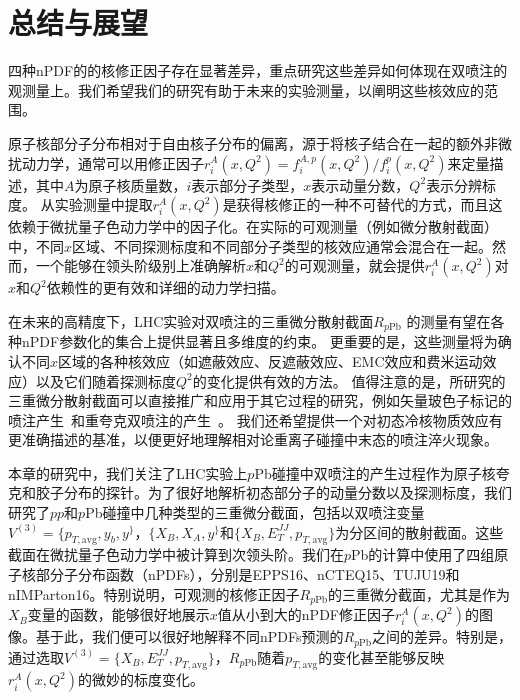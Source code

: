 
\chapter{总结与展望}

四种nPDF的的核修正因子存在显著差异，重点研究这些差异如何体现在双喷注的观测量上。我们希望我们的研究有助于未来的实验测量，以阐明这些核效应的范围。



	原子核部分子分布相对于自由核子分布的偏离，源于将核子结合在一起的额外非微扰动力学，通常可以用修正因子$r_i^A(x,Q^2)={f_i^{A,p}(x,Q^2)}/{f_i^p(x,Q^2)}$来定量描述，其中$A$为原子核质量数，$i$表示部分子类型，$x$表示动量分数，$Q^2$表示分辨标度。
	从实验测量中提取$r_i^A(x,Q^2)$是获得核修正的一种不可替代的方式，而且这依赖于微扰量子色动力学中的因子化。在实际的可观测量（例如微分散射截面）中，不同$x$区域、不同探测标度和不同部分子类型的核效应通常会混合在一起。然而，一个能够在领头阶级别上准确解析$x$和$Q^2$的可观测量，就会提供$r_i^A(x,Q^2)$对$x$和$Q^2$依赖性的更有效和详细的动力学扫描。

	在未来的高精度下，LHC实验对双喷注的三重微分散射截面$R_{p\textrm{Pb}}$ 的测量有望在各种nPDF参数化的集合上提供显著且多维度的约束。
	更重要的是，这些测量将为确认不同$x$区域的各种核效应（如遮蔽效应、反遮蔽效应、EMC效应和费米运动效应）以及它们随着探测标度$Q^2$的变化提供有效的方法。
	值得注意的是，所研究的三重微分散射截面可以直接推广和应用于其它过程的研究，例如矢量玻色子标记的喷注产生~\cite{Ma:2018tjv,Zhang:2018urd,Zhang:2021oki}和重夸克双喷注的产生~\cite{Dai:2018mhw}。
	我们还希望提供一个对初态冷核物质效应有更准确描述的基准，以便更好地理解相对论重离子碰撞中末态的喷注淬火现象。

	本章的研究中，我们关注了LHC实验上$p$Pb碰撞中双喷注的产生过程作为原子核夸克和胶子分布的探针。为了很好地解析初态部分子的动量分数以及探测标度，我们研究了$pp$和$p$Pb碰撞中几种类型的三重微分截面，包括以双喷注变量$V^{(3)}=\{p_{T,\textrm{avg}},y_b,y^\}$，$\{X_B,X_A,y^\}$和$\{X_B,E_T^{{JJ}},p_{T,\textrm{avg}}\}$为分区间的散射截面。这些截面在微扰量子色动力学中被计算到次领头阶。我们在$p$Pb的计算中使用了四组原子核部分子分布函数（nPDFs），分别是EPPS16、nCTEQ15、TUJU19和nIMParton16。特别说明，可观测的核修正因子$R_{p\textrm{Pb}}$的三重微分截面，尤其是作为$X_B$变量的函数，能够很好地展示$x$值从小到大的nPDF修正因子$r_i^{A}(x,Q^2)$的图像。基于此，我们便可以很好地解释不同nPDFs预测的$R_{p\textrm{Pb}}$之间的差异。特别是，通过选取$V^{(3)}=\{X_B,E_T^{{JJ}},p_{T,\textrm{avg}}\}$，$R_{p\textrm{Pb}}$随着$p_{T,\textrm{avg}}$的变化甚至能够反映$r_i^{A}(x,Q^2)$的微妙的标度变化。


